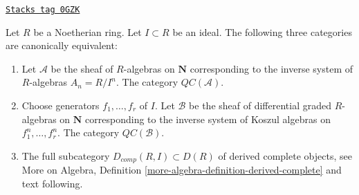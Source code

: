 \begin{proposition}
\label{sdga-proposition-derived-complete}
\href{https://stacks.math.columbia.edu/tag/0GZK}{\texttt{Stacks tag 0GZK}}

Let $R$ be a Noetherian ring. Let $I \subset R$ be an ideal.
The following three categories are canonically equivalent:
\begin{enumerate}
\item Let $\mathcal{A}$ be the sheaf of $R$-algebras on $\mathbf{N}$
corresponding to the inverse system of $R$-algebras $A_n = R/I^n$.
The category $\mathit{QC}(\mathcal{A})$.
\item Choose generators $f_1, \ldots, f_r$ of $I$. Let
$\mathcal{B}$ be the sheaf of differential graded $R$-algebras
on $\mathbf{N}$ corresponding to the inverse system of
Koszul algebras on $f_1^n, \ldots, f_r^n$.
The category $\mathit{QC}(\mathcal{B})$.
\item The full subcategory $D_{comp}(R, I) \subset D(R)$
of derived complete objects, see More on Algebra, Definition
\ref{more-algebra-definition-derived-complete} and text following.
\end{enumerate}
\end{proposition}


